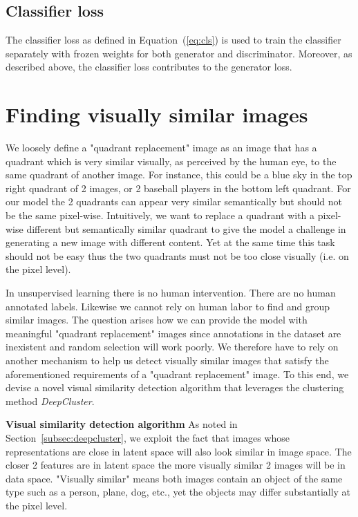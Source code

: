 \documentclass[a4paper,12pt]{report}
\begin{document}
\subsection{Classifier loss}
The classifier loss as defined in Equation~(\ref{eq:cls}) is used to train the classifier separately with frozen weights for both generator and discriminator. Moreover, as described above, the classifier loss contributes to the generator loss.



\section{Finding visually similar images} \label{subsec:img_clustering}
We loosely define a "quadrant replacement" image as an image that has a quadrant which is very similar visually, as perceived by the human eye, to the same quadrant of another image. For instance, this could be a blue sky in the top right quadrant of 2 images, or 2 baseball players in the bottom left quadrant. For our model the 2 quadrants can appear very similar semantically but should not be the same pixel-wise. Intuitively, we want to replace a quadrant with a pixel-wise different but semantically similar quadrant to give the model a challenge in generating a new image with different content. Yet at the same time this task should not be easy thus the two quadrants must not be too close visually (i.e. on the pixel level).

In unsupervised learning there is no human intervention. There are no human annotated labels. Likewise we cannot rely on human labor to find and group similar images. The question arises how we can provide the model with meaningful "quadrant replacement" images since annotations in the dataset are inexistent and random selection will work poorly. We therefore have to rely on another mechanism to help us detect visually similar images that satisfy the aforementioned requirements of a "quadrant replacement" image. To this end, we devise a novel visual similarity detection algorithm that leverages the clustering method \textit{DeepCluster}.

\textbf{Visual similarity detection algorithm} As noted in Section~\ref{subsec:deepcluster}, we exploit the fact that images whose representations are close in latent space will also look similar in image space. The closer 2 features are in latent space the more visually similar 2 images will be in data space. "Visually similar" means both images contain an object of the same type such as a person, plane, dog, etc., yet the objects may differ substantially at the pixel level.
\end{document}
